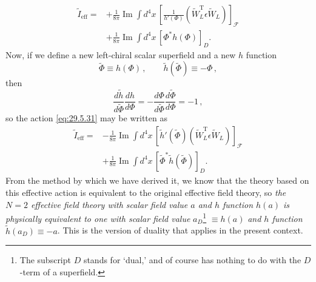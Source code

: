 \begin{equation}
  \begin{aligned}
  \widetilde I_{\mathrm{eff}}
  ={}&+\frac{1}{8\pi}\operatorname{Im}\int d^4x\,
    \left[
      \frac{1}{h'(\Phi)}
      \left(\widetilde W_L^{\mathrm T}\epsilon\widetilde W_L\right)
    \right]_{\mathcal F}
  \\
  &+\frac{1}{8\pi}\operatorname{Im}\int d^4x\,
    \left[\Phi^*h(\Phi)\right]_D.
  \end{aligned}
  \tag{29.5.31}\label{eq:29.5.31}
\end{equation}
Now, if we define a new left-chiral scalar superfield and a new \(h\)
function
\begin{equation}
  \widetilde\Phi\equiv h(\Phi)\,,
  \qquad
  \widetilde h(\widetilde\Phi)\equiv-\Phi\,,
  \tag{29.5.32}\label{eq:29.5.32}
\end{equation}
then
\begin{equation}
  \frac{d\widetilde h}{d\widetilde\Phi}\frac{dh}{d\Phi}
  =-\frac{d\Phi}{d\widetilde\Phi}
    \frac{d\widetilde\Phi}{d\Phi}
  =-1\,,
  \tag{29.5.33}\label{eq:29.5.33}
\end{equation}
so the action \eqref{eq:29.5.31} may be written as
\begin{equation}
  \begin{aligned}
  \widetilde I_{\mathrm{eff}}
  ={}&-\frac{1}{8\pi}\operatorname{Im}\int d^4x\,
    \left[
      \widetilde h'(\widetilde\Phi)
      \left(\widetilde W_L^{\mathrm T}\epsilon\widetilde W_L\right)
    \right]_{\mathcal F}
  \\
  &+\frac{1}{8\pi}\operatorname{Im}\int d^4x\,
    \left[\widetilde\Phi^*\widetilde h(\widetilde\Phi)\right]_D.
  \end{aligned}
  \tag{29.5.34}\label{eq:29.5.34}
\end{equation}
From the method by which we have derived it, we know that the theory based on
this effective action is equivalent to the original effective field theory,
so \textit{the \(N=2\) effective field theory with scalar field value \(a\)
and \(h\) function \(h(a)\) is physically equivalent to one with scalar
field value} \(a_D\)\footnote{The subscript \(D\) stands for `dual,' and of
course has nothing to do with the \(D\)-term of a superfield.}
\(\equiv h(a)\) \textit{and \(h\) function}
\(\widetilde h(a_D)\equiv-a\). This is the version of duality that applies
in the present context.

